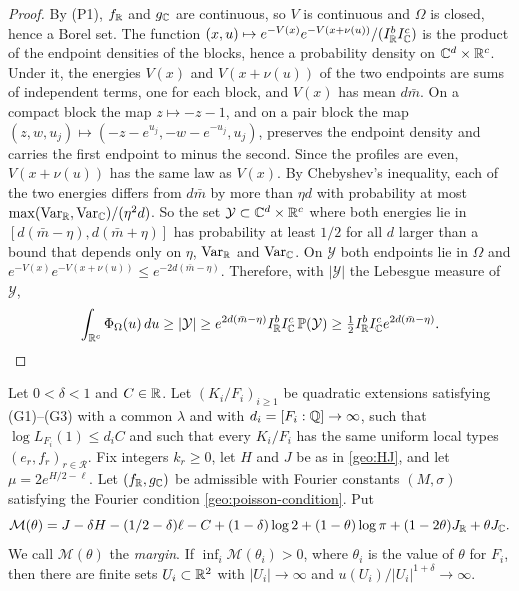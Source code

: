 \begin{proof}
By (P1), $f_\mathbb R$ and $g_\mathbb C$ are continuous, so $V$ is continuous and
$\Omega$ is closed, hence a Borel set. The function
$(x,u)\mapsto e^{-V(x)}e^{-V(x+\nu(u))}/(I_\mathbb R^bI_\mathbb C^c)$ is the
product of the endpoint densities of the blocks, hence a probability
density on $\mathbb C^d\times\mathbb R^c$. Under it, the energies $V(x)$ and
$V(x+\nu(u))$ of the two endpoints are sums of independent terms, one for
each block, and $V(x)$ has mean $d\bar m$. On a compact block the map
$z\mapsto-z-1$, and on a pair block the map
$(z,w,u_j)\mapsto(-z-e^{u_j},-w-e^{-u_j},u_j)$, preserves the endpoint
density and carries the first endpoint to minus the second. Since the
profiles are even, $V(x+\nu(u))$ has the same law as $V(x)$. By
Chebyshev's inequality, each of the two energies differs from $d\bar m$
by more than $\eta d$ with probability at most
$\max(\mathrm{Var}_\mathbb R,\mathrm{Var}_\mathbb C)/(\eta^2d)$. So the set
$\mathcal Y\subset\mathbb C^d\times\mathbb R^c$ where both energies lie in
$[d(\bar m-\eta),d(\bar m+\eta)]$ has probability at least $1/2$ for all
$d$ larger than a bound that depends only on $\eta$, $\mathrm{Var}_\mathbb R$ and
$\mathrm{Var}_\mathbb C$. On $\mathcal Y$ both endpoints lie in $\Omega$ and
$e^{-V(x)}e^{-V(x+\nu(u))}\le e^{-2d(\bar m-\eta)}$. Therefore, with
$|\mathcal Y|$ the Lebesgue measure of $\mathcal Y$,
\[
 \int_{\mathbb R^c}\Phi_\Omega(u)\,du\ge|\mathcal Y|
 \ge e^{2d(\bar m-\eta)}I_\mathbb R^bI_\mathbb C^c\,\mathbb P(\mathcal Y)
 \ge\tfrac12I_\mathbb R^bI_\mathbb C^ce^{2d(\bar m-\eta)}.
\]
\end{proof}

\begin{proposition}\label{geo:transfer}
Let $0<\delta<1$ and $C\in\mathbb R$. Let $(K_i/F_i)_{i\ge1}$ be quadratic
extensions satisfying (G1)--(G3) with a common $\lambda$ and with
$d_i=[F_i:\mathbb Q]\to\infty$, such that $\log L_{F_i}(1)\le d_iC$ and such
that every $K_i/F_i$ has the same uniform local types
$(e_r,f_r)_{r\in\mathcal R}$. Fix integers $k_r\ge0$, let $H$ and $J$ be
as in \eqref{geo:HJ}, and let $\mu=2e^{H/2-\ell}$. Let $(f_\mathbb R,g_\mathbb C)$ be
admissible with Fourier constants $(M,\sigma)$ satisfying the Fourier
condition \eqref{geo:poisson-condition}. Put
\begin{equation}\label{geo:general-margin}
 \mathcal M(\theta)=J-\delta H-(1/2-\delta)\ell-C
 +(1-\delta)\log2+(1-\theta)\log\pi
 +(1-2\theta)J_\mathbb R+\theta J_\mathbb C.
\end{equation}
We call $\mathcal M(\theta)$ the \emph{margin}. If
$\inf_i\mathcal M(\theta_i)>0$, where $\theta_i$ is the value of
$\theta$ for $F_i$, then there are finite sets $U_i\subset\mathbb R^2$ with
$|U_i|\to\infty$ and $u(U_i)/|U_i|^{1+\delta}\to\infty$.
\end{proposition}

